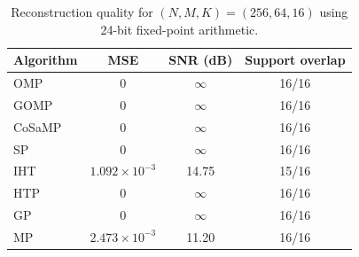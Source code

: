 \begin{table}[!t]
\centering
\caption{Reconstruction quality for $(N,M,K)=(256,64,16)$ using 24-bit fixed-point arithmetic.}
\label{tab:reconstruction_quality}
\begin{tabular}{lccc}
\hline
Algorithm & MSE & SNR (dB) & Support overlap \\
\hline
OMP & 0 & $\infty$ & 16/16 \\
GOMP & 0 & $\infty$ & 16/16 \\
CoSaMP & 0 & $\infty$ & 16/16 \\
SP & 0 & $\infty$ & 16/16 \\
IHT & $1.092\times10^{-3}$ & 14.75 & 15/16 \\
HTP & 0 & $\infty$ & 16/16 \\
GP & 0 & $\infty$ & 16/16 \\
MP & $2.473\times10^{-3}$ & 11.20 & 16/16 \\
\hline
\end{tabular}
\end{table}
